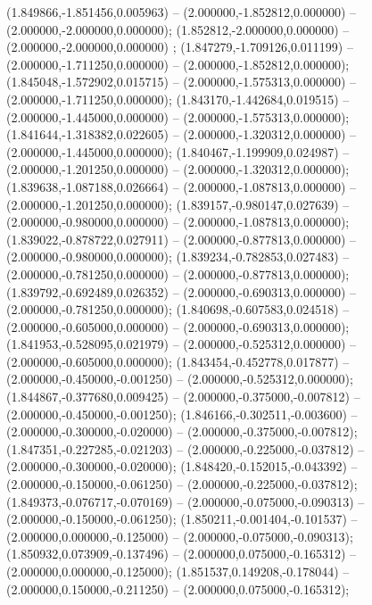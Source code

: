  (1.849866,-1.851456,0.005963) -- (2.000000,-1.852812,0.000000) -- (2.000000,-2.000000,0.000000);
 (1.852812,-2.000000,0.000000) -- (2.000000,-2.000000,0.000000) ;
 (1.847279,-1.709126,0.011199) -- (2.000000,-1.711250,0.000000) -- (2.000000,-1.852812,0.000000);
 (1.845048,-1.572902,0.015715) -- (2.000000,-1.575313,0.000000) -- (2.000000,-1.711250,0.000000);
 (1.843170,-1.442684,0.019515) -- (2.000000,-1.445000,0.000000) -- (2.000000,-1.575313,0.000000);
 (1.841644,-1.318382,0.022605) -- (2.000000,-1.320312,0.000000) -- (2.000000,-1.445000,0.000000);
 (1.840467,-1.199909,0.024987) -- (2.000000,-1.201250,0.000000) -- (2.000000,-1.320312,0.000000);
 (1.839638,-1.087188,0.026664) -- (2.000000,-1.087813,0.000000) -- (2.000000,-1.201250,0.000000);
 (1.839157,-0.980147,0.027639) -- (2.000000,-0.980000,0.000000) -- (2.000000,-1.087813,0.000000);
 (1.839022,-0.878722,0.027911) -- (2.000000,-0.877813,0.000000) -- (2.000000,-0.980000,0.000000);
 (1.839234,-0.782853,0.027483) -- (2.000000,-0.781250,0.000000) -- (2.000000,-0.877813,0.000000);
 (1.839792,-0.692489,0.026352) -- (2.000000,-0.690313,0.000000) -- (2.000000,-0.781250,0.000000);
 (1.840698,-0.607583,0.024518) -- (2.000000,-0.605000,0.000000) -- (2.000000,-0.690313,0.000000);
 (1.841953,-0.528095,0.021979) -- (2.000000,-0.525312,0.000000) -- (2.000000,-0.605000,0.000000);
 (1.843454,-0.452778,0.017877) -- (2.000000,-0.450000,-0.001250) -- (2.000000,-0.525312,0.000000);
 (1.844867,-0.377680,0.009425) -- (2.000000,-0.375000,-0.007812) -- (2.000000,-0.450000,-0.001250);
 (1.846166,-0.302511,-0.003600) -- (2.000000,-0.300000,-0.020000) -- (2.000000,-0.375000,-0.007812);
 (1.847351,-0.227285,-0.021203) -- (2.000000,-0.225000,-0.037812) -- (2.000000,-0.300000,-0.020000);
 (1.848420,-0.152015,-0.043392) -- (2.000000,-0.150000,-0.061250) -- (2.000000,-0.225000,-0.037812);
 (1.849373,-0.076717,-0.070169) -- (2.000000,-0.075000,-0.090313) -- (2.000000,-0.150000,-0.061250);
 (1.850211,-0.001404,-0.101537) -- (2.000000,0.000000,-0.125000) -- (2.000000,-0.075000,-0.090313);
 (1.850932,0.073909,-0.137496) -- (2.000000,0.075000,-0.165312) -- (2.000000,0.000000,-0.125000);
 (1.851537,0.149208,-0.178044) -- (2.000000,0.150000,-0.211250) -- (2.000000,0.075000,-0.165312);
